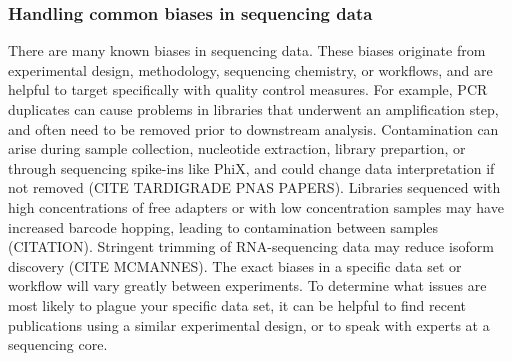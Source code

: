 \documentclass[10pt,letterpaper]{article}
\begin{document}

\subsubsection*{Handling common biases in sequencing data} %

There are many known biases in sequencing data. 
These biases originate from experimental design, methodology, sequencing chemistry, or workflows, and are helpful to target specifically with quality control measures. 
For example, PCR duplicates can cause problems in libraries that underwent an amplification step, and often need to be removed prior to downstream analysis. 
Contamination can arise during sample collection, nucleotide extraction, library prepartion, or through sequencing spike-ins like PhiX, and could change data interpretation if not removed (CITE TARDIGRADE PNAS PAPERS).
Libraries sequenced with high concentrations of free adapters or with low concentration samples may have increased barcode hopping, leading to contamination between samples (CITATION). 
Stringent trimming of RNA-sequencing data may reduce isoform discovery (CITE MCMANNES). 
The exact biases in a specific data set or workflow will vary greatly between experiments. 
To determine what issues are most likely to plague your specific data set, it can be helpful to find recent publications using a similar experimental design, or to speak with experts at a sequencing core.
\end{document}
